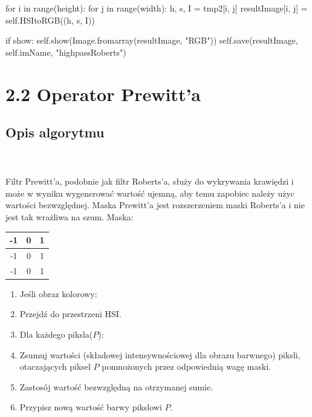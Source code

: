 \documentclass[final,a4paper,openany,12pt]{mwbk}
\begin{document}
for i in range(height): \newline
\indent for j in range(width): \newline
\indent h, s, I = tmp2[i, j] \newline
\indent resultImage[i, j] = self.HSItoRGB((h, s, I)) \newline

if show: \newline
\indent self.show(Image.fromarray(resultImage, "RGB")) \newline
\indent self.save(resultImage, self.imName, "highpassRoberts") \newline
\newpage


\section*{2.2 Operator Prewitt'a}
\subsection*{Opis algorytmu}
\hfill
\\\\
\indent Filtr Prewitt'a, podobnie jak filtr Roberts'a, służy do wykrywania krawiędzi i może w wyniku wygenerować wartość ujemną, aby temu zapobiec należy użyc wartości bezwzględnej. Maska Prewitt'a jest rozszerzeniem maski Roberts'a i nie jest tak wrażliwa na szum. Maska:

\begin{center}
	\begin{tabular}{|c|c|c|}
		\hline
		-1 & 0 & 1\\
		\hline
		-1 & 0 & 1\\
		\hline
		-1 & 0 & 1\\
		\hline
	\end{tabular}
\end{center}

\begin{enumerate}
	\item Jeśli obraz kolorowy:
	\item Przejdź do przestrzeni HSI.
	\item Dla każdego piksla($P$):
	\item Zsumuj wartości (składowej intensywnościowej dla obrazu barwnego) piksli, otaczających piksel $P$ pomnożonych przez odpowiednią wagę maski.
	\item Zastosój wartość bezwzględną na otrzymanej sumie.
	\item Przypisz nową wartość barwy pikslowi $P$.
\end{enumerate}
\end{document}
